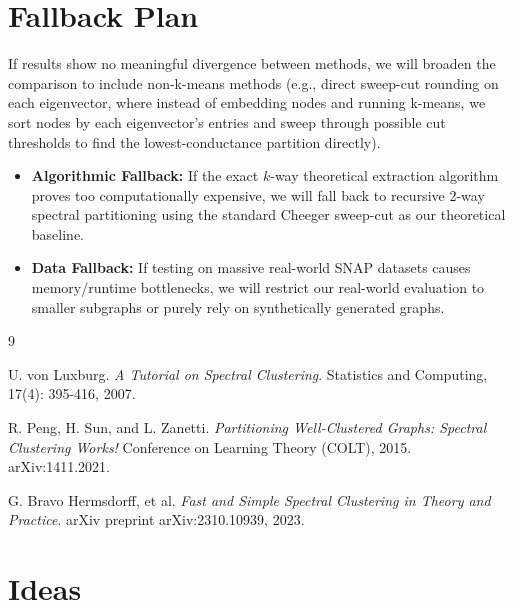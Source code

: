\documentclass{article}
\begin{document}
\section{Fallback Plan}
If results show no meaningful divergence between methods, we will broaden the comparison to include non-k-means methods (e.g., direct sweep-cut rounding on each eigenvector, where instead of embedding nodes and running k-means, we sort nodes by each eigenvector's entries and sweep through possible cut thresholds to find the lowest-conductance partition directly).
\begin{itemize}
    \item \textbf{Algorithmic Fallback:} If the exact $k$-way theoretical extraction algorithm proves too computationally expensive, we will fall back to recursive 2-way spectral partitioning using the standard Cheeger sweep-cut as our theoretical baseline.
    \item \textbf{Data Fallback:} If testing on massive real-world SNAP datasets causes memory/runtime bottlenecks, we will restrict our real-world evaluation to smaller subgraphs or purely rely on synthetically generated graphs.
\end{itemize}


\vspace{1em}
\begin{thebibliography}{9}

U. von Luxburg.
\textit{A Tutorial on Spectral Clustering}.
Statistics and Computing, 17(4): 395-416, 2007.

R. Peng, H. Sun, and L. Zanetti.
\textit{Partitioning Well-Clustered Graphs: Spectral Clustering Works!}
Conference on Learning Theory (COLT), 2015. arXiv:1411.2021.

G. Bravo Hermsdorff, et al.
\textit{Fast and Simple Spectral Clustering in Theory and Practice}.
arXiv preprint arXiv:2310.10939, 2023.

\end{thebibliography}

\appendix

\newpage
\section{Ideas}
\end{document}
